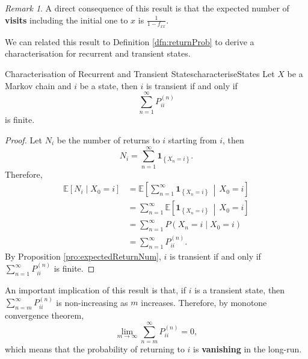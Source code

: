 \documentclass[math, code]{amznotes}
\theoremstyle{remark}
\newtheorem*{remark}{Remark}
\begin{document}
\begin{notebox}
    \begin{remark}
        A direct consequence of this result is that the expected number of \textbf{visits} including the initial one to $x$ is $\frac{1}{1 - f_{xx}}$.
    \end{remark}
\end{notebox}
We can related this result to Definition \ref{dfn:returnProb} to derive a characterisation for recurrent and transient states.
\begin{probox}{Characterisation of Recurrent and Transient States}{characteriseStates}
    Let $X$ be a Markov chain and $i$ be a state, then $i$ is transient if and only if 
    \begin{equation*}
        \sum_{n = 1}^{\infty}P^{\left(n\right)}_{ii}
    \end{equation*}
    is finite.
    \tcblower
    \begin{proof}
        Let $N_i$ be the number of returns to $i$ starting from $i$, then
        \begin{equation*}
            N_i = \sum_{n = 1}^{\infty}\mathbf{1}_{\left\{X_n = i\right\}}.
        \end{equation*}
        Therefore, 
        \begin{align*}
            \mathbb{E}\left[N_i \mid X_0 = i\right] & = \mathbb{E}\left[\sum_{n = 1}^{\infty}\mathbf{1}_{\left\{X_n = i\right\}} \,\middle\vert\, X_0 = i\right] \\
            & = \sum_{n = 1}^{\infty}\mathbb{E}\left[\mathbf{1}_{\left\{X_n = i\right\}} \,\middle\vert\, X_0 = i\right] \\
            & = \sum_{n = 1}^{\infty}P\left(X_n = i \mid X_0 = i\right) \\
            & = \sum_{n = 1}^{\infty}P^{\left(n\right)}_{ii}.
        \end{align*}
        By Proposition \ref{pro:expectedReturnNum}, $i$ is transient if and only if $\sum_{n = 1}^{\infty}P^{\left(n\right)}_{ii}$ is finite.
    \end{proof}
\end{probox}
An important implication of this result is that, if $i$ is a transient state, then $\sum_{n = m}^{\infty}P^{\left(n\right)}_{ii}$ is non-increasing as $m$ increases. Therefore, by monotone convergence theorem, 
\begin{equation*}
    \lim_{m \to \infty}\sum_{n = m}^{\infty}P^{\left(n\right)}_{ii} = 0,
\end{equation*}
which means that the probability of returning to $i$ is \textbf{vanishing} in the long-run.
\end{document}
